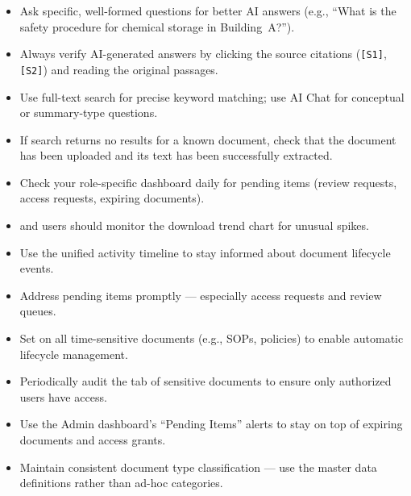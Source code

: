 \begin{ugBestPractice}
  \begin{itemize}[leftmargin=14pt]
    \item Ask specific, well-formed questions for better AI
          answers (e.g., ``What is the safety procedure for
          chemical storage in Building~A?'').
    \item Always verify AI-generated answers by clicking the
          source citations (\texttt{[S1]}, \texttt{[S2]}) and
          reading the original passages.
    \item Use full-text search for precise keyword matching;
          use AI Chat for conceptual or summary-type questions.
    \item If search returns no results for a known document,
          check that the document has been uploaded and its
          text has been successfully extracted.
  \end{itemize}
\end{ugBestPractice}

\vspace{6pt}

\begin{ugBestPractice}
  \begin{itemize}[leftmargin=14pt]
    \item Check your role-specific dashboard daily for pending
          items (review requests, access requests, expiring
          documents).
    \item {} and  users should
          monitor the download trend chart for unusual spikes.
    \item Use the unified activity timeline to stay informed
          about document lifecycle events.
    \item Address pending items promptly --- especially access
          requests and review queues.
  \end{itemize}
\end{ugBestPractice}

\vspace{6pt}

\begin{ugBestPractice}
  \begin{itemize}[leftmargin=14pt]
    \item Set  on all time-sensitive
          documents (e.g., SOPs, policies) to enable
          automatic lifecycle management.
    \item Periodically audit the  tab of
          sensitive documents to ensure only authorized users
          have access.
    \item Use the Admin dashboard's ``Pending Items'' alerts
          to stay on top of expiring documents and access
          grants.
    \item Maintain consistent document type classification ---
          use the master data definitions rather than ad-hoc
          categories.
  \end{itemize}
\end{ugBestPractice}

